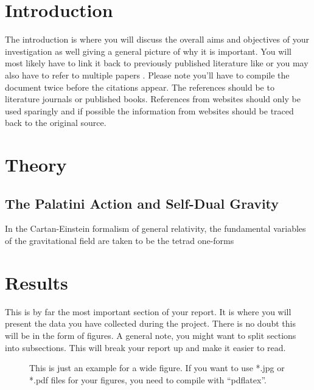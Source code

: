 \documentclass[a4paper,12pt, onecolumn, notitlepage]{article}
\begin{document}
\section{Introduction}
The introduction is where you will discuss the overall aims and objectives of your investigation as well giving a general picture of why it is important. You will most likely have to link it back to previously published literature like  \cite{Paper_1} or you may also have to refer to multiple papers \cite{Paper_1, Paper_2, Paper_3}. Please note you'll have to compile the document twice before the citations appear. The references should be to literature journals or published books. References from websites should only be used sparingly and if possible the information from websites should be traced back to the original source. 


\section{Theory}
\subsection{The Palatini Action and Self-Dual Gravity}
In the Cartan-Einstein formalism of general relativity, the fundamental variables of the gravitational field are taken to be the tetrad one-forms 
\section{Results}
This is by far the most important section of your report. It is where you will present the data you have collected during the project. There is no doubt this will be in the form of figures. A general note, you might want to split sections into subsections. This will break your report up and make it easier to read.

\begin{figure*}[t]
\centering

\caption{\small This is just an example for a wide figure.
                If you want to use *.jpg or *.pdf files
                for your figures, you need to compile with
                ``pdflatex''.}
\label{fig: fig_2}
\end{figure*}
\end{document}
